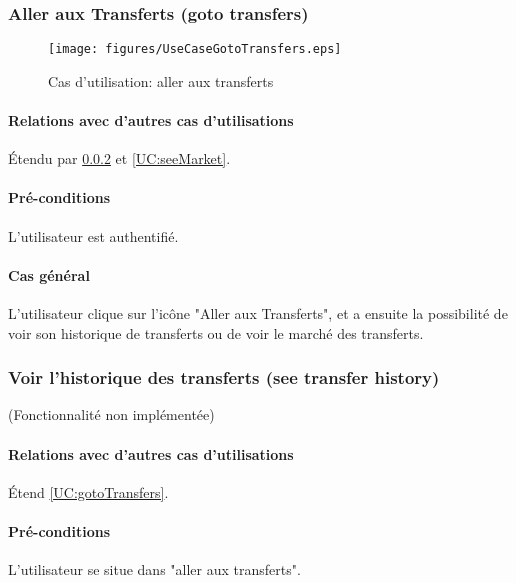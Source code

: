 
\subsubsection{Aller aux Transferts (goto transfers)} 
\begin{figure}[h]
  \centering
  \texttt{[image: figures/UseCaseGotoTransfers.eps]}
   \caption{\label{fig:UC:gotoTransfers} Cas d'utilisation: aller aux transferts}
\end{figure}

\label{UC:gotoTransfers}
\paragraph{Relations avec d'autres cas d'utilisations}
Étendu par \ref{UC:transfersHistory} et \ref{UC:seeMarket}.
\paragraph{Pré-conditions}
\begin{list}{}{\leftmargin=1.5em}
\item{L'utilisateur est authentifié.}
\end{list}
\paragraph{Cas général}
L'utilisateur clique sur l'icône "Aller aux Transferts", et a ensuite la possibilité de voir son historique de transferts ou de voir le marché des transferts.

\subsubsection{Voir l'historique des transferts (see transfer history)}
\label{UC:transfersHistory}
(Fonctionnalité non implémentée)
\paragraph{Relations avec d'autres cas d'utilisations}
Étend \ref{UC:gotoTransfers}.
\paragraph{Pré-conditions}
\begin{list}{}{\leftmargin=1.5em}
\item{L'utilisateur se situe dans "aller aux transferts".}
\end{list}
